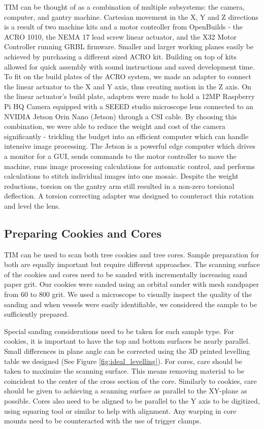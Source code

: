 \documentclass[a4paper,12pt]{article}
\begin{document}
TIM can be thought of as a combination of multiple subsystems: the camera, computer, and gantry machine. 
Cartesian movement in the X, Y and Z directions is a result of two machine kits and a motor controller from OpenBuilds - the ACRO 1010, the NEMA 17 lead screw linear actuator, and the X32 Motor Controller running GRBL firmware. 
Smaller and larger working planes easily be achieved by purchasing a different sized ACRO kit.
Building on top of kits allowed for quick assembly with sound instructions and saved development time. 
To fit on the build plates of the ACRO system, we made an adapter to connect the linear actuator to the X and Y axis, thus creating motion in the Z axis.
On the linear actuator's build plate, adapters were made to hold a 12MP Raspberry Pi HQ Camera equipped with a SEEED studio microscope lens connected to an NVIDIA Jetson Orin Nano (Jetson) through a CSI cable.
By choosing this combination, we were able to reduce the weight and cost of the camera significantly - trickling the budget into an efficient computer which can handle intensive image processing. 
The Jetson is a powerful edge computer which drives a monitor for a GUI, sends commands to the motor controller to move the machine, runs image processing calculations for automatic control, and performs calculations to stitch individual images into one mosaic. 
Despite the weight reductions, torsion on the gantry arm still resulted in a non-zero torsional deflection. A torsion correcting adapter was designed to counteract this rotation and level the lens.


\subsection{Preparing Cookies and Cores}
TIM can be used to scan both tree cookies and tree cores. Sample preparation for both are equally important but require different approaches.
The scanning surface of the cookies and cores need to be sanded with incrementally increasing sand paper grit. Our cookies were sanded using an orbital sander with mesh sandpaper from 60 to 800 grit.
We used a microscope to visually inspect the quality of the sanding and when vessels were easily identifiable, we considered the sample to be sufficiently prepared.

Special sanding considerations need to be taken for each sample type. 
For cookies, it is important to have the top and bottom surfaces be nearly parallel. Small differences in plane angle can be corrected using the 3D printed levelling table we designed (See Figure \ref{fig:ideal_levelling}). 
For cores, care should be taken to maximize the scanning surface. This means removing material to be coincident to the center of the cross section of the core. 
Similarly to cookies, care should be given to achieving a  scanning surface as parallel to the XY-plane as possible.
Cores also need to be aligned to be parallel to the Y axis to be digitized, using squaring tool or similar to help with alignment. Any warping in core mounts need to be counteracted with the use of trigger clamps. 
\end{document}
